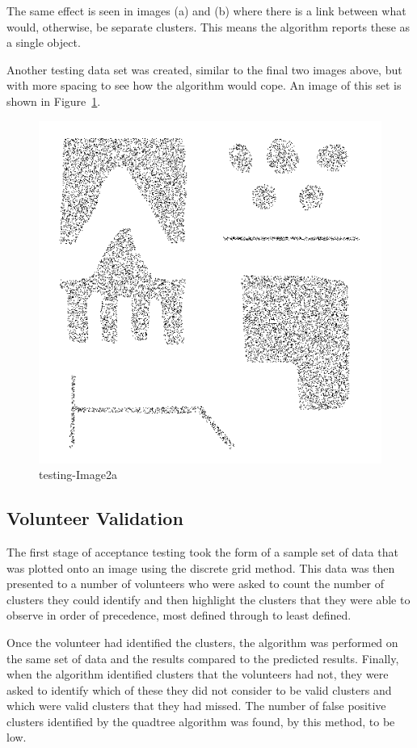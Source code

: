 The same effect is seen in images (a) and (b) where there is a link between
what would, otherwise, be separate clusters. This means the algorithm reports
these as a single object.

Another testing data set was created, similar to the final two images above,
but with more spacing to see how the algorithm would cope. An image of this set
is shown in Figure~\ref{fig:testing-image2a}.

\begin{figure}[tbh]
	\centering
	\includegraphics[width=0.5\linewidth]{testing-image2a.png}
	\caption[]{testing-Image2a}
	\label{fig:testing-image2a}
\end{figure}

\subsection{Volunteer Validation}
\label{sub:volunteer_validation}

The first stage of acceptance testing took the form of a sample set of data
that was plotted onto an image using the discrete grid method. This data was
then presented to a number of volunteers who were asked to count the number of
clusters they could identify and then highlight the clusters that they were
able to observe in order of precedence, most defined through to least defined.

Once the volunteer had identified the clusters, the algorithm was performed on
the same set of data and the results compared to the predicted results.
Finally, when the algorithm identified clusters that the volunteers had not,
they were asked to identify which of these they did not consider to be valid
clusters and which were valid clusters that they had missed. The number of
false positive clusters identified by the quadtree algorithm was found, by this
method, to be low.

